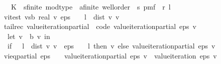 \begin{isabellebody}
\ \ \ K\ {\isacharcolon}{\kern0pt}{\isacharcolon}{\kern0pt}\ {\isachardoublequoteopen}{\isacharparenleft}{\kern0pt}{\isacharprime}{\kern0pt}s{\isacharcolon}{\kern0pt}{\isacharcolon}{\kern0pt}{\isacharbraceleft}{\kern0pt}finite{\isacharcomma}{\kern0pt}\ mod{\isacharunderscore}{\kern0pt}type{\isacharbraceright}{\kern0pt}\ {\isasymtimes}\ {\isacharprime}{\kern0pt}a{\isacharcolon}{\kern0pt}{\isacharcolon}{\kern0pt}{\isacharbraceleft}{\kern0pt}finite{\isacharcomma}{\kern0pt}\ wellorder{\isacharbraceright}{\kern0pt}{\isacharparenright}{\kern0pt}\ {\isasymRightarrow}\ {\isacharprime}{\kern0pt}s\ pmf{\isachardoublequoteclose}\ \ r\ l\isanewline
{}\isanewline
{}\isamarkupfalse%
\ {\isachardoublequoteopen}vi{\isacharunderscore}{\kern0pt}test\ {\isacharparenleft}{\kern0pt}v{\isacharcolon}{\kern0pt}{\isacharcolon}{\kern0pt}{\isacharprime}{\kern0pt}s{\isasymRightarrow}\isactrlsub b\ real{\isacharparenright}{\kern0pt}\ v{\isacharprime}{\kern0pt}\ eps\ {\isacharequal}{\kern0pt}\ {}\ {\isacharasterisk}{\kern0pt}\ l\ {\isacharasterisk}{\kern0pt}\ dist\ v\ v{\isacharprime}{\kern0pt}{\isachardoublequoteclose}\isanewline
\isanewline
{}\isamarkupfalse%
\ {\isacharparenleft}{\kern0pt}tailrec{\isacharparenright}{\kern0pt}\ value{\isacharunderscore}{\kern0pt}iteration{\isacharunderscore}{\kern0pt}partial\ \ {\isacharbrackleft}{\kern0pt}code{\isacharbrackright}{\kern0pt}{\isacharcolon}{\kern0pt}\ {\isachardoublequoteopen}value{\isacharunderscore}{\kern0pt}iteration{\isacharunderscore}{\kern0pt}partial\ eps\ v\ {\isacharequal}{\kern0pt}\ \isanewline
\ \ {\isacharparenleft}{\kern0pt}let\ v{\isacharprime}{\kern0pt}\ {\isacharequal}{\kern0pt}\ {\isasymL}\isactrlsub b\ v\ in\isanewline
\ \ {\isacharparenleft}{\kern0pt}if\ {}\ {\isacharasterisk}{\kern0pt}\ l\ {\isacharasterisk}{\kern0pt}\ dist\ v\ v{\isacharprime}{\kern0pt}\ {\isacharless}{\kern0pt}\ eps\ {\isacharasterisk}{\kern0pt}\ {\isacharparenleft}{\kern0pt}{}\ {\isacharminus}{\kern0pt}\ l{\isacharparenright}{\kern0pt}\ then\ v{\isacharprime}{\kern0pt}\ else\ {\isacharparenleft}{\kern0pt}value{\isacharunderscore}{\kern0pt}iteration{\isacharunderscore}{\kern0pt}partial\ eps\ v{\isacharprime}{\kern0pt}{\isacharparenright}{\kern0pt}{\isacharparenright}{\kern0pt}{\isacharparenright}{\kern0pt}{\isachardoublequoteclose}\isanewline
\isanewline
{}\isamarkupfalse%
\ vi{\isacharunderscore}{\kern0pt}eq{\isacharunderscore}{\kern0pt}partial{\isacharcolon}{\kern0pt}\ {\isachardoublequoteopen}eps\ {\isachargreater}{\kern0pt}\ {}\ {\isasymLongrightarrow}\ value{\isacharunderscore}{\kern0pt}iteration{\isacharunderscore}{\kern0pt}partial\ eps\ v\ {\isacharequal}{\kern0pt}\ value{\isacharunderscore}{\kern0pt}iteration\ eps\ v{\isachardoublequoteclose}\isanewline

\end{isabellebody}
